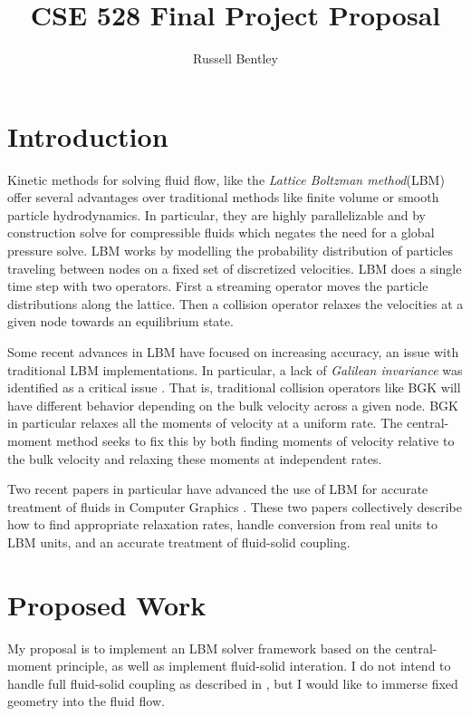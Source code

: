 \documentclass{article}
\title{CSE 528 Final Project Proposal}
\author{Russell Bentley}
\begin{document}
\twocolumn

\maketitle
\section{Introduction}

Kinetic methods for solving fluid flow,
like the \textit{Lattice Boltzman method}(LBM) offer several advantages
over traditional methods like finite volume or smooth particle hydrodynamics.
In particular, they are highly parallelizable 
and by construction solve for compressible fluids which negates the need 
for a global pressure solve. 
LBM works by modelling the probability distribution 
of particles traveling between nodes on a fixed set of discretized velocities.
LBM does a single time step with two operators.
First a streaming operator moves the particle distributions along the lattice.
Then a collision operator relaxes the velocities at a given node towards 
an equilibrium state.

Some recent advances in LBM have focused on increasing accuracy, 
an issue with traditional LBM implementations. 
In particular, a lack of \textit{Galilean invariance} 
was identified as a critical issue \cite{Geier2006}.
That is, traditional collision operators
like BGK will have different behavior depending on the bulk velocity across a given node.
BGK in particular relaxes all the moments of velocity at a uniform rate.
The central-moment method \cite{Geier2006, De2017, De2019, Li2020} seeks to fix this by
both finding moments of velocity relative to the bulk velocity and relaxing 
these moments at independent rates.

Two recent papers in particular have advanced the use of LBM for accurate 
treatment of fluids in Computer Graphics \cite{Li2020, Lyu2021}.
These two papers collectively describe how to find appropriate relaxation rates,
handle conversion from real units to LBM units, and an accurate treatment of fluid-solid coupling.

\section{Proposed Work}
My proposal is to implement an LBM solver framework 
based on the central-moment principle, as well as implement fluid-solid interation.
I do not intend to handle full fluid-solid coupling as described in \cite{Lyu2021},
but I would like to immerse fixed geometry into the fluid flow.
\end{document}
